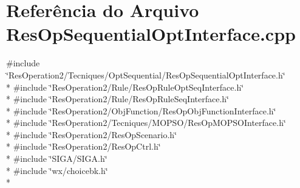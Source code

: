 \section{Referência do Arquivo Res\+Op\+Sequential\+Opt\+Interface.\+cpp}
\label{_res_op_sequential_opt_interface_8cpp}
{\ttfamily \#include \char`\"{}Res\+Operation2/\+Tecniques/\+Opt\+Sequential/\+Res\+Op\+Sequential\+Opt\+Interface.\+h\char`\"{}}\\*
{\ttfamily \#include \char`\"{}Res\+Operation2/\+Rule/\+Res\+Op\+Rule\+Opt\+Seq\+Interface.\+h\char`\"{}}\\*
{\ttfamily \#include \char`\"{}Res\+Operation2/\+Rule/\+Res\+Op\+Rule\+Seq\+Interface.\+h\char`\"{}}\\*
{\ttfamily \#include \char`\"{}Res\+Operation2/\+Obj\+Function/\+Res\+Op\+Obj\+Function\+Interface.\+h\char`\"{}}\\*
{\ttfamily \#include \char`\"{}Res\+Operation2/\+Tecniques/\+M\+O\+P\+S\+O/\+Res\+Op\+M\+O\+P\+S\+O\+Interface.\+h\char`\"{}}\\*
{\ttfamily \#include \char`\"{}Res\+Operation2/\+Res\+Op\+Scenario.\+h\char`\"{}}\\*
{\ttfamily \#include \char`\"{}Res\+Operation2/\+Res\+Op\+Ctrl.\+h\char`\"{}}\\*
{\ttfamily \#include \char`\"{}S\+I\+G\+A/\+S\+I\+G\+A.\+h\char`\"{}}\\*
{\ttfamily \#include \char`\"{}wx/choicebk.\+h\char`\"{}}\\*
